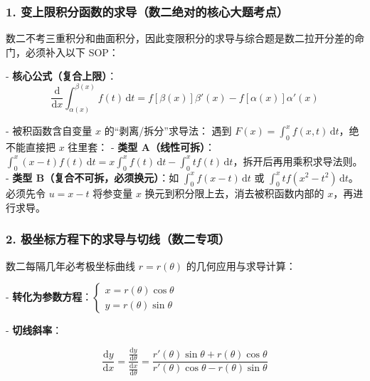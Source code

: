 \documentclass[11pt,a4paper,UTF8]{ctexart}
\begin{document}
\pagestyle{fancy}
\fancyhf{}
\fancyhead[R]{\small\color{TitlePurple}\nouppercase{\leftmark}}
\renewcommand{\headrulewidth}{0.5pt}

\tableofcontents
\newpage
{}


\subsubsection{1. 变上限积分函数的求导（数二绝对的核心大题考点）}

数二不考三重积分和曲面积分，因此变限积分的求导与综合题是数二拉开分差的命门，必须补入以下 SOP：

-   \textbf{核心公式（复合上限）}：
\begin{equation*}
\frac{\mathrm{d}}{\mathrm{d}x} \int_{\alpha(x)}^{\beta(x)} f(t)\,\mathrm{d}t = f[\beta(x)]\beta'(x) - f[\alpha(x)]\alpha'(x)
\end{equation*}

-   \textit{}被积函数含自变量 $x$ 的“剥离/拆分”求导法\textit{}： 遇到 $F(x) = \int_0^x f(x, t)\,\mathrm{d}t$，\textit{}绝不能直接把 $x$ 往里套\textit{}：
    -   \textbf{类型 A（线性可拆）}：$\int_0^x (x - t) f(t)\,\mathrm{d}t = x\int_0^x f(t)\,\mathrm{d}t - \int_0^x t f(t)\,\mathrm{d}t$，拆开后再用乘积求导法则。
    -   \textbf{类型 B（复合不可拆，必须换元）}：如 $\int_0^x f(x - t)\,\mathrm{d}t$ 或 $\int_0^x t f(x^2 - t^2)\,\mathrm{d}t$。必须先令 $u = x - t$ 将参变量 $x$ 换元到积分限上去，消去被积函数内部的 $x$，再进行求导。


\subsubsection{2. 极坐标方程下的求导与切线（数二专项）}

数二每隔几年必考极坐标曲线 $r = r(\theta)$ 的几何应用与求导计算：

-   \textbf{转化为参数方程}：$\begin{cases} x = r(\theta)\cos\theta \\ y = r(\theta)\sin\theta \end{cases}$

-   \textbf{切线斜率}：


\begin{equation*}
\frac{\mathrm{d}y}{\mathrm{d}x} = \frac{\frac{\mathrm{d}y}{\mathrm{d}\theta}}{\frac{\mathrm{d}x}{\mathrm{d}\theta}} = \frac{r'(\theta)\sin\theta + r(\theta)\cos\theta}{r'(\theta)\cos\theta - r(\theta)\sin\theta}
\end{equation*}
\end{document}
